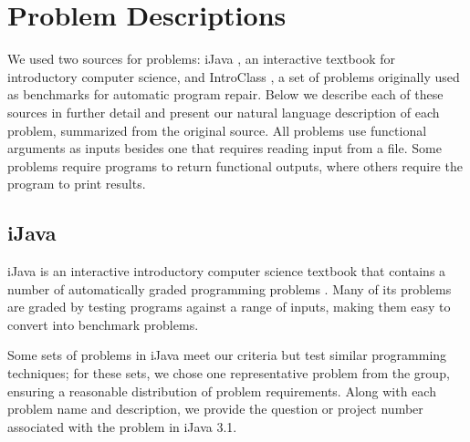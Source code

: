 \documentclass{sig-alternate}
\begin{document}


\section{Problem Descriptions} \label{descriptionsSection}

We used two sources for problems: iJava \cite{iJava, Moll:2011:IOI:1968521.1968535}, an interactive textbook for introductory computer science, and IntroClass \cite{ManyBugsAndIntroClass, Brun13TRgptest}, a set of problems originally used as benchmarks for automatic program repair. Below we describe each of these sources in further detail and present our natural language description of each problem, summarized from the original source. All problems use functional arguments as inputs besides one that requires reading input from a file. Some problems require programs to return functional outputs, where others require the program to print results.

\subsection{iJava}


iJava is an interactive introductory computer science textbook that contains a number of automatically graded programming problems \cite{iJava, Moll:2011:IOI:1968521.1968535}.
 Many of its problems are graded by testing programs against a range of inputs, making them easy to convert into benchmark problems.


Some sets of problems in iJava meet our criteria but test similar programming techniques; for these sets, we chose one representative problem from the group, ensuring a reasonable distribution of problem requirements. Along with each problem name and description, we provide the question or project number associated with the problem in iJava 3.1.
\end{document}
